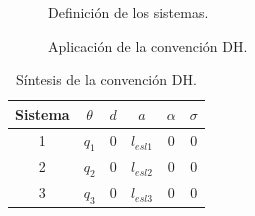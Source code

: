 \documentclass[a4paper,12pt]{article}
\begin{document}
\begin{figure}[H]
    \centering
    \begin{adjustbox}{scale = 0.6, max width=\columnwidth}
    \end{adjustbox}
    \caption{Definición de los sistemas.}
\end{figure}

\begin{figure}[H]
    \centering
    \begin{adjustbox}{scale = 0.58, max width=\columnwidth}
    \end{adjustbox}
    \caption{Aplicación de la convención DH.}
\end{figure}

\begin{table}[H]
    \centering
    \begin{tabular}{|c|c|c|c|c|c|}
    \hline
    Sistema & $\theta$ & $d$ & $a$         & $\alpha$ & $\sigma$ \\ \hline
    1       & $q_1$     & 0   & $l_{esl1}$  & 0        & 0        \\ \hline
    2       & $q_2$     & 0   & $l_{esl2}$  & 0        & 0        \\ \hline
    3       & $q_3$     & 0   & $l_{esl3}$  & 0        & 0        \\ \hline
    \end{tabular}
    \caption{Síntesis de la convención DH.}
\end{table}
\end{document}
